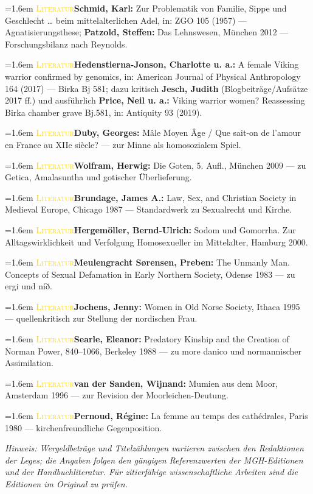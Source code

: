 \documentclass[11pt,a4paper,ngerman]{scrartcl}
\newcommand{\litentry}[2]{\par\noindent\hangindent=1.6em\hangafter=1
  {\footnotesize\scshape\textcolor{gold}{#1}}\quad #2\par\smallskip}
\begin{document}
\litentry{Literatur}{\textbf{Schmid, Karl:} Zur Problematik von Familie, Sippe und Geschlecht … beim mittelalterlichen Adel, in: ZGO 105 (1957) — Agnatisierungsthese; \textbf{Patzold, Steffen:} Das Lehnswesen, München 2012 — Forschungsbilanz nach Reynolds.}
\litentry{Literatur}{\textbf{Hedenstierna-Jonson, Charlotte u. a.:} A female Viking warrior confirmed by genomics, in: American Journal of Physical Anthropology 164 (2017) — Birka Bj 581; dazu kritisch \textbf{Jesch, Judith} (Blogbeiträge/Aufsätze 2017 ff.) und ausführlich \textbf{Price, Neil u. a.:} Viking warrior women? Reassessing Birka chamber grave Bj.581, in: Antiquity 93 (2019).}
\litentry{Literatur}{\textbf{Duby, Georges:} Mâle Moyen Âge / Que sait-on de l'amour en France au XIIe siècle? — zur Minne als homosozialem Spiel.}
\litentry{Literatur}{\textbf{Wolfram, Herwig:} Die Goten, 5. Aufl., München 2009 — zu Getica, Amalasuntha und gotischer Überlieferung.}
\litentry{Literatur}{\textbf{Brundage, James A.:} Law, Sex, and Christian Society in Medieval Europe, Chicago 1987 — Standardwerk zu Sexualrecht und Kirche.}
\litentry{Literatur}{\textbf{Hergemöller, Bernd-Ulrich:} Sodom und Gomorrha. Zur Alltagswirklichkeit und Verfolgung Homosexueller im Mittelalter, Hamburg 2000.}
\litentry{Literatur}{\textbf{Meulengracht Sørensen, Preben:} The Unmanly Man. Concepts of Sexual Defamation in Early Northern Society, Odense 1983 — zu ergi und níð.}
\litentry{Literatur}{\textbf{Jochens, Jenny:} Women in Old Norse Society, Ithaca 1995 — quellenkritisch zur Stellung der nordischen Frau.}
\litentry{Literatur}{\textbf{Searle, Eleanor:} Predatory Kinship and the Creation of Norman Power, 840–1066, Berkeley 1988 — zu more danico und normannischer Assimilation.}
\litentry{Literatur}{\textbf{van der Sanden, Wijnand:} Mumien aus dem Moor, Amsterdam 1996 — zur Revision der Moorleichen-Deutung.}
\litentry{Literatur}{\textbf{Pernoud, Régine:} La femme au temps des cathédrales, Paris 1980 — kirchenfreundliche Gegenposition.}

\emph{Hinweis: Wergeldbeträge und Titelzählungen variieren zwischen den Redaktionen der Leges; die Angaben folgen den gängigen Referenzwerten der MGH-Editionen und der Handbuchliteratur. Für zitierfähige wissenschaftliche Arbeiten sind die Editionen im Original zu prüfen.}
\end{document}
